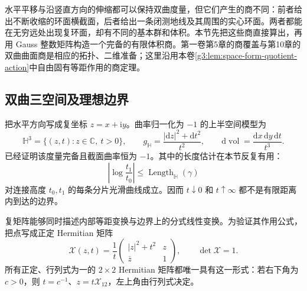 水平平移与沿竖直方向的伸缩都可以保持双曲度量，但它们产生的商不同：前者给出不断收缩的环面横截面，后者给出一条闭测地线及其周围的实心环面。两者都能在无穷远处出现复环面，却有不同的基本群和体积。本节先把这些商直接算出，再用 Gauss 整数矩阵构造一个完备的有限体积商。第一卷第5章的商覆盖与第10章的双曲曲面商是相应的拓扑、二维准备；这里沿用本卷\cref{g3:lem:space-form-quotient-action}中自由固有等距作用的商定理。

\subsection{双曲三空间及理想边界}
\label{g3:subsec:D04:01}

把水平方向写成复坐标 \(z=x+\mathrm iy\)。曲率归一化为 \(-1\) 的上半空间模型为
\begin{equation}\label{g3:eq:D-hyperbolic-upper-halfspace}
	\mathbb H^3=\{(z,t):z\in\mathbb C,\ t>0\},\qquad
	g_{\mathbb H}=\frac{|\mathrm dz|^2+\mathrm dt^2}{t^2},
	\qquad \mathrm d\operatorname{vol}=\frac{\mathrm dx\,\mathrm dy\,\mathrm dt}{t^3}.
\end{equation}
已经证明该度量完备且截面曲率恒为 \(-1\)。其中的长度估计在本节反复有用：
\begin{equation}\label{g3:eq:D-height-length-bound}
	\left|\log\frac{t_1}{t_0}\right|
	\le\operatorname{Length}_{\mathbb H}(\gamma)
\end{equation}
对连接高度 \(t_0,t_1\) 的每条分片光滑曲线成立。因而 \(t\downarrow0\) 和 \(t\uparrow\infty\) 都不是有限距离内到达的边界。

\ProseParagraphBreak
复矩阵能够同时描述内部等距变换与边界上的分式线性变换。为验证其作用公式，把点写成正定 Hermitian 矩阵
\begin{equation}\label{g3:eq:D-hermitian-halfspace}
	\mathcal X(z,t)=\frac1t
	\begin{pmatrix}|z|^2+t^2&z\\\overline z&1\end{pmatrix},
	\qquad \det\mathcal X=1.
\end{equation}
所有正定、行列式为一的 \(2\times2\) Hermitian 矩阵都唯一具有这一形式：若右下角为 \(c>0\)，则 \(t=c^{-1}\)、\(z=t\mathcal X_{12}\)，左上角由行列式决定。


